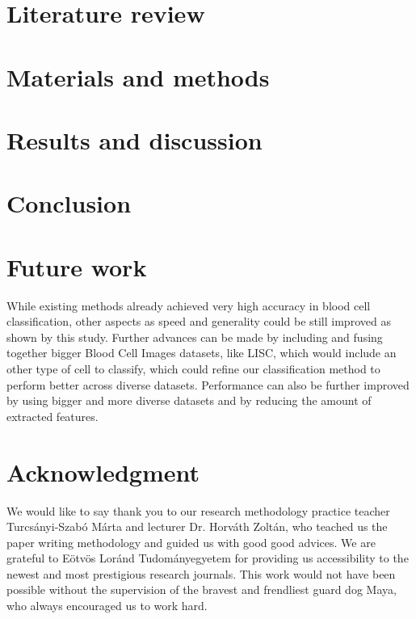 \documentclass[conference]{IEEEtran}
\begin{document}


\section{Literature review}
\section{Materials and methods}

\section{Results and discussion}
\section{Conclusion}
\section{Future work}

While existing methods already achieved very high accuracy in blood cell classification, other aspects as speed and generality could be still improved as shown by this study. 
Further advances can be made by including and fusing together bigger Blood Cell Images datasets, like LISC, which would include an other type of cell to classify, which could refine our classification method to perform better across diverse datasets.
Performance can also be further improved by using bigger and more diverse datasets and by reducing the
amount of extracted features.

\section*{Acknowledgment}

We would like to say thank you to our research methodology practice teacher Turcsányi-Szabó Márta and lecturer Dr. Horváth Zoltán, who teached us the paper writing methodology and guided us with good good advices.
We are grateful to Eötvös Loránd Tudományegyetem for providing us accessibility to the newest and most prestigious research journals.
This work would not have been possible without the supervision of the bravest and frendliest guard dog Maya, who always encouraged us to work hard.
\end{document}
